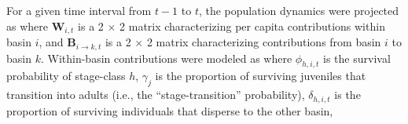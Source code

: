 \documentclass[11pt]{article}
\begin{document}
For a given time interval from $t-1$ to $t$,
the population dynamics were projected as
%
%
where $\mathbf{W}_{i,t}$ is a 2 $\times$ 2 matrix characterizing
per capita contributions within basin $i$,
and $\mathbf{B}_{i\rightarrow k,t}$ is a 2 $\times$ 2 matrix characterizing
contributions from basin $i$ to basin $k$.
Within-basin contributions were modeled as
%
where $\phi_{h,i,t}$ is the survival probability of stage-class $h$,
$\gamma_{j}$ is the proportion of surviving juveniles that transition into adults
(i.e., the ``stage-transition'' probability),
$\delta_{h,i,t}$ is the proportion of surviving individuals that disperse to the other basin,
\end{document}
